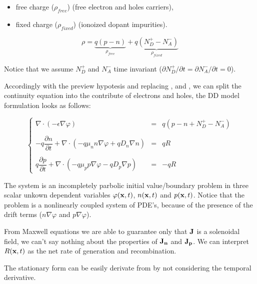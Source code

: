 \begin{itemize}
\item free charge ($\rho_{free}$) (free electron and holes carriers),
\item fixed charge ($\rho_{fixed}$) (ionoized dopant impurities).
\end{itemize} 

\begin{equation}
\label{eq: charge balance}
\rho = \underbrace{q(p-n)}_{\rho_{free}} +\underbrace{q(N_D^+-N_A^-)}_{\rho_{fixed}}
\end{equation}

 Notice that we assume $N_D^+$ and $N_A^-$ time invariant ($\partial N_D^+ / \partial t=\partial N_A^- / \partial t = 0$).

 Accordingly with the preview hypotesis and replacing ,  and , we can split the continuity equation into the contribute of electrons and holes, the DD model formulation looks as follows:
 
\begin{equation}
\label{eq: full problem}
\left\{
\begin{array}{rcl}
\nabla \cdot (-\epsilon \nabla \varphi) & = & q(p-n+N_D^+-N_A^-)\\ \\
-q\dfrac{\partial n}{\partial t} + \nabla \cdot ( - q\mu_n n \nabla \varphi + qD_n \nabla n )& = & qR\\ \\
q\dfrac{\partial p}{\partial t} + \nabla \cdot (- q\mu_p p \nabla \varphi - qD_p \nabla p )& = & -qR 
\end{array}
\right.
\end{equation}

The system is an incompletely parbolic initial value/boundary problem in three scalar unkown dependent variables $\varphi(\mathbf{x},t)$, $n(\mathbf{x},t)$ and $p(\mathbf{x},t)$. Notice that the problem is a nonlinearly coupled system of PDE's, because of the presence of the drift terms ($n\nabla \varphi$ and $p \nabla 	\varphi$). 

From Maxwell equations we are able to guarantee only that $\mathbf{J}$ is a solenoidal field, we can't say nothing about the properties of $\mathbf{J_n}$ and $\mathbf{J_p}$. We can interpret $R(\mathbf{x},t)$ as the net rate of generation and recombination.

The stationary form can be easily derivate from  by not considering the temporal derivative.

